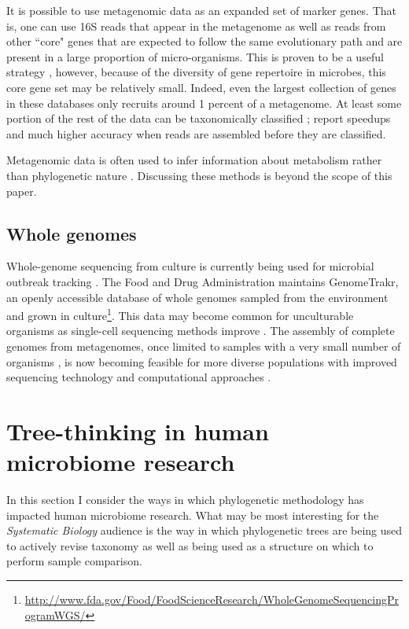\documentclass{amsart}
\begin{document}
It is possible to use metagenomic data as an expanded set of marker genes.
That is, one can use 16S reads that appear in the metagenome as well as reads from other ``core" genes that are expected to follow the same evolutionary path and are present in a large proportion of micro-organisms.
This is proven to be a useful strategy \citep{von2007quantitative,wu2008amphora,stark2010mltreemap,kembel2011phylogenetic}, however, because of the diversity of gene repertoire in microbes, this core gene set may be relatively small.
Indeed, even the largest collection of genes in these databases only recruits around 1 percent of a metagenome.
At least some portion of the rest of the data can be taxonomically classified \citep[methods reviewed by][]{mande2012classification}; \citet{treangen2013metamos} report speedups and much higher accuracy when reads are assembled before they are classified.

Metagenomic data is often used to infer information about metabolism rather than phylogenetic nature \citep{greenblum2012metagenomic,abubucker2012metabolic}.
Discussing these methods is beyond the scope of this paper.


\subsection{Whole genomes}
Whole-genome sequencing from culture is currently being used for microbial outbreak tracking \citep{koser2012rapid,snitkin2012tracking}.
The Food and Drug Administration maintains GenomeTrakr, an openly accessible database of whole genomes sampled from the environment and grown in culture\footnote{\url{http://www.fda.gov/Food/FoodScienceResearch/WholeGenomeSequencingProgramWGS/}}.
This data may become common for unculturable organisms as single-cell sequencing methods improve \citep[reviewed in][]{kalisky2011single}.
The assembly of complete genomes from metagenomes, once limited to samples with a very small number of organisms \citep{baker2010enigmatic}, is now becoming feasible for more diverse populations with improved sequencing technology and computational approaches \citep{howe2012assembling,pell2012scaling,iverson2012untangling,emerson2012metagenomic,podell2013assembly}.


\section{Tree-thinking in human microbiome research}

In this section I consider the ways in which phylogenetic methodology has impacted human microbiome research.
What may be most interesting for the \textit{Systematic Biology} audience is the way in which phylogenetic trees are being used to actively revise taxonomy as well as being used as a structure on which to perform sample comparison.
\end{document}
